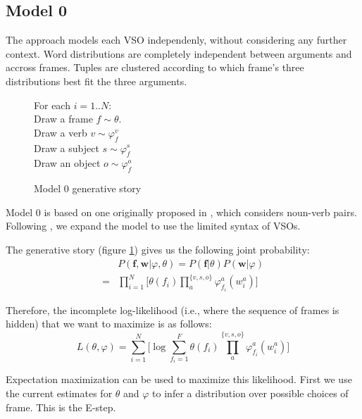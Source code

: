 \documentclass[11pt,twocolumn,DIV=11]{scrartcl}
\renewcommand\phi\varphi
\begin{document}
\subsection{Model 0}

The approach models each VSO independenly, without considering any further context.
Word distributions are completely independent between arguments and accross frames.
Tuples are clustered according to which frame's three distributions best fit the 
three arguments.

\begin{figure}

    \begin{snugshade}
    \scriptsize
    For each $i = 1..N$:\\
    \hspace*{15pt} Draw a frame $f \sim \theta$.\\
    \hspace*{15pt} Draw a verb $v \sim \phi_f^v$\\
    \hspace*{15pt} Draw a subject $s \sim \phi_f^s$\\
    \hspace*{15pt} Draw an object $o \sim \phi_f^o$
    \end{snugshade}

    

    \caption{Model 0 generative story}
    \label{gen0}

\end{figure}

Model 0 is based on one originally proposed in \citet{rooth1999}, which 
considers noun-verb pairs. Following \citet{oconnor2013}, we expand the model
to use the limited syntax of VSOs.

The generative story (figure \ref{gen0}) gives us the following joint probability:
\begin{align*}
&P(\mathbf{f},\mathbf{w}|\phi,\theta) 
  = P(\mathbf{f}|\theta)P(\mathbf{w}|\phi)\\
  =& \prod_{i=1}^{N}\big[\theta(f_i) \prod_a^{\{v,s,o\}}\phi_{f_i}^a(w_i^a)\big]
\end{align*}

Therefore, the incomplete log-likelihood (i.e., where the sequence of frames
is hidden) that we want to maximize is as follows:
\[
L(\theta,\phi) = \sum_{i=1}^N\big[\log \sum_{f_i=1}^F\theta(f_i)\prod_{a}^{\{v,s,o\}}\phi_{f_i}^a(w^a_i)\big]
\]

Expectation maximization can be used to maximize this likelihood.
First we use the current estimates for $\theta$ and $\phi$ to infer a 
distribution over possible choices of frame. This is the E-step. 
\end{document}
